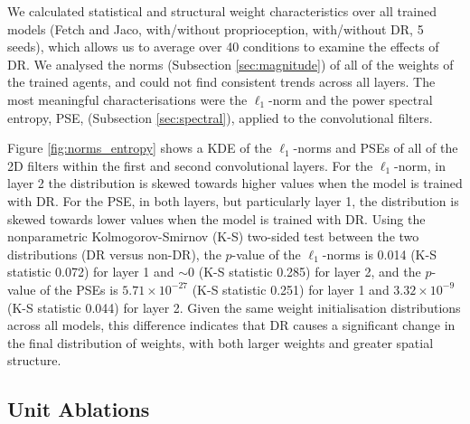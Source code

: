 We calculated statistical and structural weight characteristics over all
trained models (Fetch and Jaco, with/without proprioception,
with/without DR, 5 seeds), which allows us to average over 40 conditions
to examine the effects of DR. We analysed the norms (Subsection
\ref{sec:magnitude}) of all of the weights of the trained agents, and
could not find consistent trends across all layers. The most meaningful
characterisations were the \(\ell_1\)-norm and the power spectral
entropy, PSE, (Subsection \ref{sec:spectral}), applied to the
convolutional filters.

Figure \ref{fig:norms_entropy} shows a KDE of the \(\ell_1\)-norms and
PSEs of all of the 2D filters within the first and second convolutional
layers. For the \(\ell_1\)-norm, in layer 2 the distribution is skewed
towards higher values when the model is trained with DR. For the PSE, in
both layers, but particularly layer 1, the distribution is skewed
towards lower values when the model is trained with DR. Using the
nonparametric Kolmogorov-Smirnov (K-S) two-sided test between the two
distributions (DR versus non-DR), the \(p\)-value of the
\(\ell_1\)-norms is 0.014 (K-S statistic 0.072) for layer 1 and
\(\sim 0\) (K-S statistic 0.285) for layer 2, and the \(p\)-value of the
PSEs is \(5.71\times10^{-27}\) (K-S statistic 0.251) for layer 1 and
\(3.32\times10^{-9}\) (K-S statistic 0.044) for layer 2. Given the same
weight initialisation distributions across all models, this difference
indicates that DR causes a significant change in the final distribution
of weights, with both larger weights and greater spatial structure.

\hypertarget{unit-ablations-1}{%
\subsection{Unit Ablations}\label{unit-ablations-1}}

\label{sec:unit_ablations}

